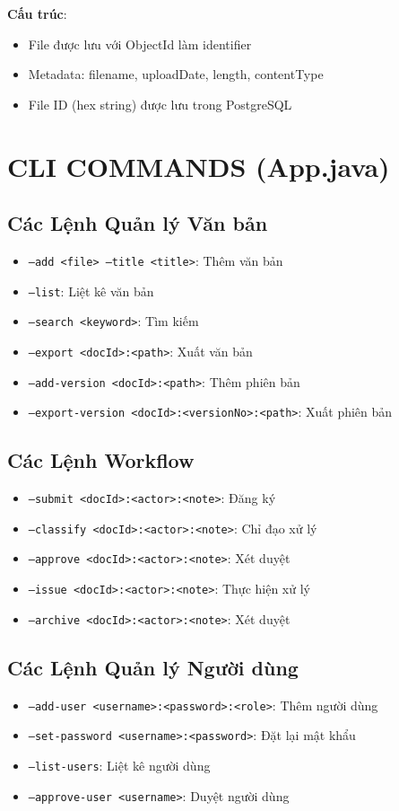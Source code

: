 \documentclass[12pt,a4paper]{article}
\begin{document}
\textbf{Cấu trúc}:
\begin{itemize}
    \item File được lưu với ObjectId làm identifier
    \item Metadata: filename, uploadDate, length, contentType
    \item File ID (hex string) được lưu trong PostgreSQL
\end{itemize}

\section{CLI COMMANDS (App.java)}

\subsection{Các Lệnh Quản lý Văn bản}
\begin{itemize}
    \item \texttt{--add <file> --title <title>}: Thêm văn bản
    \item \texttt{--list}: Liệt kê văn bản
    \item \texttt{--search <keyword>}: Tìm kiếm
    \item \texttt{--export <docId>:<path>}: Xuất văn bản
    \item \texttt{--add-version <docId>:<path>}: Thêm phiên bản
    \item \texttt{--export-version <docId>:<versionNo>:<path>}: Xuất phiên bản
\end{itemize}

\subsection{Các Lệnh Workflow}
\begin{itemize}
    \item \texttt{--submit <docId>:<actor>:<note>}: Đăng ký
    \item \texttt{--classify <docId>:<actor>:<note>}: Chỉ đạo xử lý
    \item \texttt{--approve <docId>:<actor>:<note>}: Xét duyệt
    \item \texttt{--issue <docId>:<actor>:<note>}: Thực hiện xử lý
    \item \texttt{--archive <docId>:<actor>:<note>}: Xét duyệt
\end{itemize}

\subsection{Các Lệnh Quản lý Người dùng}
\begin{itemize}
    \item \texttt{--add-user <username>:<password>:<role>}: Thêm người dùng
    \item \texttt{--set-password <username>:<password>}: Đặt lại mật khẩu
    \item \texttt{--list-users}: Liệt kê người dùng
    \item \texttt{--approve-user <username>}: Duyệt người dùng
\end{itemize}
\end{document}
